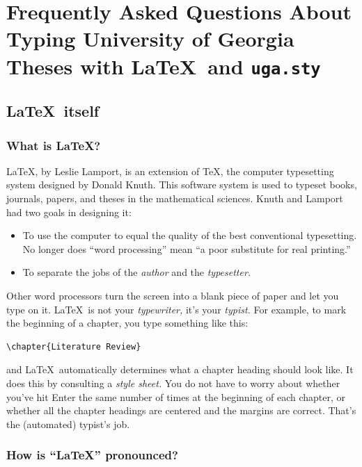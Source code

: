 \documentclass[12pt]{report}
\begin{document}
\chapter{Frequently Asked Questions About Typing University of Georgia Theses with
\LaTeX\ and {\tt uga.sty}}

\section{\LaTeX\ itself}

\subsection{What is \LaTeX?}

\LaTeX, by Leslie Lamport, is an extension of \TeX, the computer typesetting system
designed by Donald Knuth.  This software system is used to typeset books, journals,
papers, and theses in the mathematical sciences.  Knuth and Lamport had two goals
in designing it:
\begin{itemize}
\item To use the computer to equal the quality of the best conventional typesetting.
No longer does ``word processing'' mean ``a poor substitute for real printing.''
\item To separate the jobs of the \emph{author} and the \emph{typesetter.}
\end{itemize}
Other word processors turn the screen into a blank piece of paper and let you type
on it.  \LaTeX\ is not your \emph{typewriter,} it's your \emph{typist.}  For example,
to mark the beginning of a chapter, you type something like this:
\begin{verbatim}
\chapter{Literature Review}
\end{verbatim}
and \LaTeX\ automatically determines what a chapter heading should look like.
It does this by consulting a \emph{style sheet.}  You do not have to worry
about whether you've hit Enter the same number of times at the beginning of each
chapter, or whether all the chapter headings are centered and the margins are
correct.  That's the (automated) typist's job.

\subsection{How is ``\LaTeX'' pronounced?}
\end{document}

